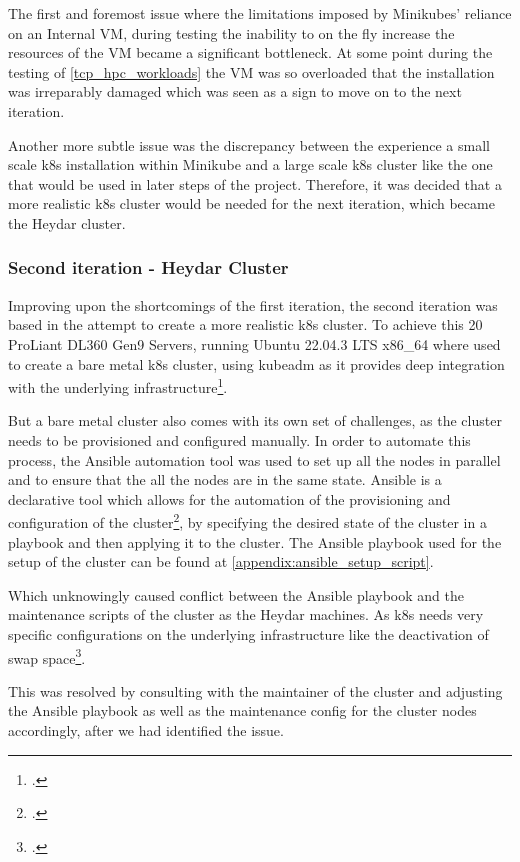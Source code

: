 The first and foremost issue where the limitations imposed by Minikubes' reliance on an Internal \ac{VM},
during testing the inability to on the fly increase the resources of the \ac{VM} became a significant bottleneck.
At some point during the testing of \ref{tcp_hpc_workloads} the \ac{VM} was so overloaded that the installation was irreparably damaged which was seen as a sign to move on to the next iteration.

Another more subtle issue was the discrepancy between the experience a small scale \ac{k8s} installation within Minikube and a large scale \ac{k8s} cluster like the one that would be used in later steps of the project.
Therefore, it was decided that a more realistic \ac{k8s} cluster would be needed for the next iteration, which became the Heydar cluster.

\subsubsection{Second iteration - Heydar Cluster}
\label{heydar_cluster}

Improving upon the shortcomings of the first iteration, the second iteration was based in the attempt to create a more realistic \ac{k8s} cluster.
To achieve this 20 ProLiant DL360 Gen9 Servers, running Ubuntu 22.04.3 LTS x86\_64 where used to create a bare metal \ac{k8s} cluster,
using kubeadm as it provides deep integration with the underlying infrastructure\footcite{CreatingClusterKubeadm}.

But a bare metal cluster also comes with its own set of challenges, as the cluster needs to be provisioned and configured manually.
In order to automate this process, the Ansible automation tool was used to set up all the nodes in parallel and to ensure that the all the nodes are in the same state.
Ansible is a declarative tool which allows for the automation of the provisioning and configuration of the cluster\footcite{Ansible2023}, by specifying the desired state of the cluster in a playbook and then applying it to the cluster.
The Ansible playbook used for the setup of the cluster can be found at \ref{appendix:ansible_setup_script}.

Which unknowingly caused conflict between the Ansible playbook and the maintenance scripts of the cluster as the Heydar machines.
As \ac{k8s} needs very specific configurations on the underlying infrastructure like the deactivation of swap space\footcite{InstallingKubeadm}.

This was resolved by consulting with the maintainer of the cluster and adjusting the Ansible playbook as well as the maintenance config for the cluster nodes accordingly, 
after we had identified the issue.


